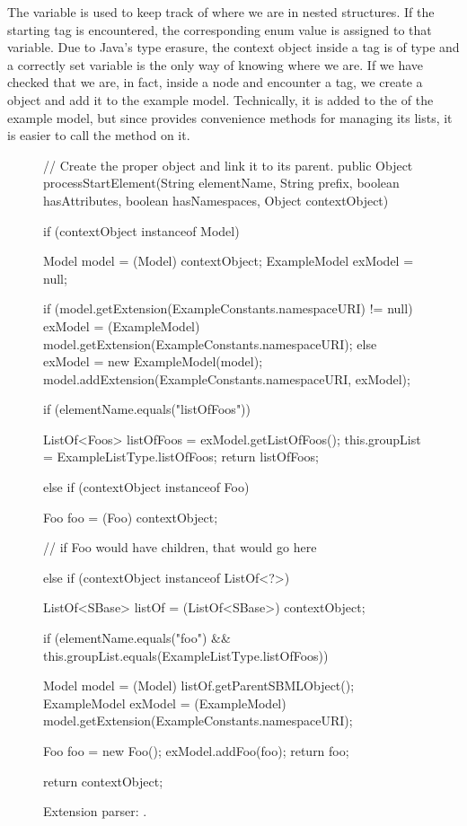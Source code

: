 The  variable is used to keep track of where we are in
nested structures.  If the  starting tag is encountered,
the corresponding enum value is assigned to that variable.  Due to Java's
type erasure, the context object inside a  tag is of type
 and a correctly set  variable is the only
way of knowing where we are.  If we have checked that we are, in fact,
inside a  node and encounter a  tag, we create a
 object and add it to the example model.  Technically, it is
added to the  of the example model, but since
 provides convenience methods for managing its lists, it
is easier to call the  method on it.

\begin{figure}[htb]
  \begin{example}[numbers=left]
// Create the proper object and link it to its parent.
public Object processStartElement(String elementName, String prefix,
    boolean hasAttributes, boolean hasNamespaces, Object contextObject) {

  if (contextObject instanceof Model) {
    Model model = (Model) contextObject;
    ExampleModel exModel = null;

    if (model.getExtension(ExampleConstants.namespaceURI) != null) {
      exModel = (ExampleModel) model.getExtension(ExampleConstants.namespaceURI);
    } else {
      exModel = new ExampleModel(model);
      model.addExtension(ExampleConstants.namespaceURI, exModel);
    }

    if (elementName.equals("listOfFoos")) {

      ListOf<Foos> listOfFoos = exModel.getListOfFoos();
      this.groupList = ExampleListType.listOfFoos;
      return listOfFoos;
    }
  } else if (contextObject instanceof Foo) {
    Foo foo = (Foo) contextObject;

    // if Foo would have children, that would go here

  }
  else if (contextObject instanceof ListOf<?>) {
    ListOf<SBase> listOf = (ListOf<SBase>) contextObject;

    if (elementName.equals("foo") && this.groupList.equals(ExampleListType.listOfFoos)) {
      Model model = (Model) listOf.getParentSBMLObject();
      ExampleModel exModel = (ExampleModel) model.getExtension(ExampleConstants.namespaceURI);

      Foo foo = new Foo();
      exModel.addFoo(foo);
      return foo;
    }
  }
  return contextObject;
}\end{example}
  \caption{Extension parser: .}
  \label{lst:ModelExtParserStartElement}
\end{figure}

